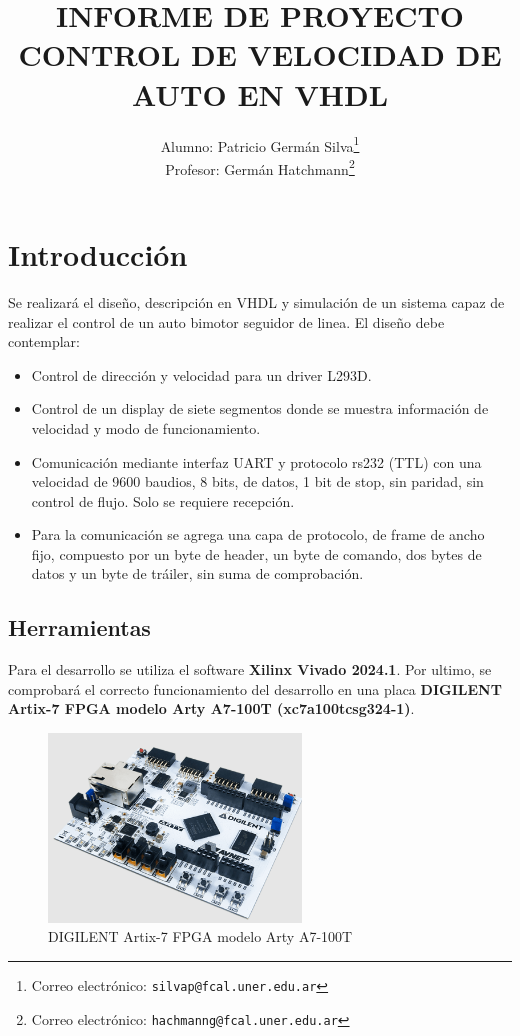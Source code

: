 \documentclass[12pt]{article}
\title{\textbf{INFORME DE PROYECTO} \\ \textbf{CONTROL DE VELOCIDAD DE AUTO EN VHDL}}
\author{Alumno: Patricio Germán Silva\thanks{Correo electrónico: \texttt{silvap@fcal.uner.edu.ar}} \\ Profesor: Germán Hatchmann\thanks{Correo electrónico: \texttt{hachmanng@fcal.uner.edu.ar}}}
\affil{\textbf{Introducción a VHDL}  \\ \textbf{Ingeniería en Mecatrónica}}
\begin{document}
\maketitle



\thispagestyle{empty}
\newpage
\tableofcontents
\thispagestyle{empty}
\newpage
{}




\section{Introducción}

Se realizará el diseño, descripción en VHDL y simulación de un sistema capaz de realizar el control de un auto bimotor seguidor de linea. El diseño debe contemplar:
\begin{itemize}
\item Control de dirección y velocidad para un driver L293D.
\item Control de un display de siete segmentos donde se muestra información de velocidad y modo de funcionamiento.
\item Comunicación mediante interfaz UART y protocolo rs232 (TTL) con una velocidad de 9600 baudios, 8 bits, de datos, 1 bit de stop, sin paridad, sin control de flujo. Solo se requiere recepción.
\item Para la comunicación se agrega una capa de protocolo, de frame de ancho fijo, compuesto por un byte de header, un byte de comando, dos bytes de datos y un byte de tráiler, sin suma de comprobación.
\end{itemize}

\subsection{Herramientas}
Para el desarrollo se utiliza el software \textbf{Xilinx Vivado 2024.1}. Por ultimo, se comprobará el correcto funcionamiento del desarrollo en una placa \textbf{DIGILENT Artix-7 FPGA modelo Arty A7-100T (xc7a100tcsg324-1)}. 

\begin{figure}[H]
    \centering
    \includegraphics[width=0.6\textwidth]{digilent-arty}
    \caption{DIGILENT  Artix-7 FPGA modelo Arty A7-100T}
\end{figure}
\end{document}
